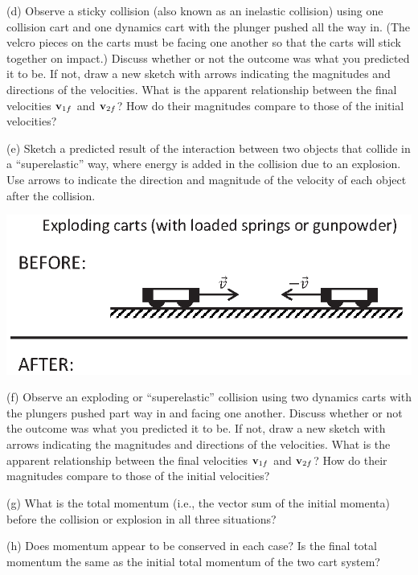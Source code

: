 (d) Observe a sticky collision (also known as an inelastic collision) using one collision cart and one dynamics cart with the plunger pushed all the way in. (The velcro pieces on the carts must be facing one another so that the carts will stick together on impact.) Discuss
whether or not the outcome was what you predicted it to be. If not, draw a new
sketch with arrows indicating the magnitudes and directions of the velocities.
What is the apparent relationship between the final velocities \( {{\bf v}_{1f}} \) and \( {{\bf v}_{2f}} \)? How do their magnitudes compare to those
of the initial velocities?
\answerspace{15mm}

(e) Sketch a predicted result of the interaction between two objects that 
collide in a ``superelastic'' way, where energy is added in the collision due 
to an explosion. Use arrows to indicate the direction and magnitude of the
velocity of each object after the collision.

{\par\centering \includegraphics{mom_cons/mom_cons_fig5_new.eps} \par}
\answerspace{1cm}

(f) Observe an exploding or ``superelastic'' collision using two dynamics carts with the plungers pushed part way in and facing one another. Discuss
whether or not the outcome was what you predicted it to be. If not, draw a new
sketch with arrows indicating the magnitudes and directions of the velocities.
What is the apparent relationship between the final velocities \( {{\bf v}_{1f}} \) and \( {{\bf v}_{2f}} \)? How do their magnitudes compare to those
of the initial velocities?
\answerspace{15mm}

\pagebreak[2]
(g) What is the total momentum (i.e., the vector sum of the initial momenta)
before the collision or explosion in all three situations?
\answerspace{20mm}

(h) Does momentum appear to be conserved in each case? Is the final total momentum
the same as the initial total momentum of the two cart system?
\answerspace{20mm}

